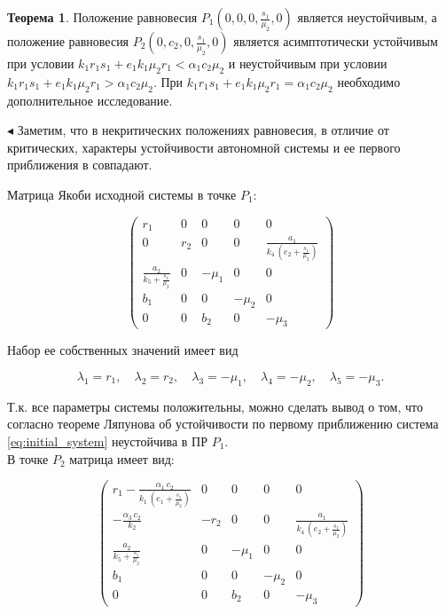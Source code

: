 \documentclass[12pt,a4paper]{extarticle}
\renewenvironment{proof}{\noindent$\blacktriangleleft$}{}
\theoremstyle{definition}
\newtheorem{theorem}{Теорема}
\theoremstyle{definition}
\theoremstyle{definition}
\begin{document}
	\begin{theorem}
		Положение равновесия $P_1\left(0,0,0,\frac{s_1}{\mu_2},0\right)$ является неустойчивым, а положение равновесия $P_2\left(0,c_2,0,\frac{s_1}{\mu_2},0\right)$ является асимптотически устойчивым при условии $k_1r_1s_1 + e_1k_1\mu_2r_1< \alpha_1c_2\mu_2$ и неустойчивым при условии $k_1r_1s_1 + e_1k_1\mu_2r_1>\alpha_1c_2\mu_2$. При $k_1r_1s_1 + e_1k_1\mu_2r_1 = \alpha_1c_2\mu_2$ необходимо дополнительное исследование.
	\end{theorem}
	\begin{proof}
		Заметим, что в некритических положениях равновесия, в отличие от критических, характеры устойчивости автономной системы и ее первого приближения в совпадают.
		
		Матрица Якоби исходной системы в точке $P_1$:
		
		\[\begin{pmatrix}
			r_{1} & 0 & 0 & 0 & 0\\ 
			0 & r_{2} & 0 & 0 & \frac{a_{1}}{k_{4}\,\left(e_{2}+\frac{s_{1}}{\mu _{2}}\right)}\\ 
			\frac{a_{2}}{k_{5}+\frac{s_{1}}{\mu _{2}}} & 0 & -\mu _{1} & 0 & 0\\ 
			b_{1} & 0 & 0 & -\mu _{2} & 0\\ 
			0 & 0 & b_{2} & 0 & -\mu _{3} 
		\end{pmatrix}\]
		
		Набор ее собственных значений имеет вид
		
		\[\lambda_1=r_1,\quad \lambda_2=r_2,\quad \lambda_3=-\mu_1,\quad \lambda_4=-\mu_2,\quad \lambda_5=-\mu_3.\]
		
		Т.к. все параметры системы положительны, можно сделать вывод о том, что согласно теореме Ляпунова об устойчивости по первому приближению система \ref{eq:initial_system} неустойчива в ПР $P_1$.\\
		В точке $P_2$ матрица имеет вид:
		
		\[\begin{pmatrix}
			r_{1}-\frac{\alpha _{1}\,c_{2}}{k_{1}\,\left(e_{1}+\frac{s_{1}}{\mu _{2}}\right)} & 0 & 0 & 0 & 0\\ 
			-\frac{\alpha _{3}\,c_{2}}{k_{2}} & -r_{2} & 0 & 0 & \frac{a_{1}}{k_{4}\,\left(e_{2}+\frac{s_{1}}{\mu _{2}}\right)}\\ 
			\frac{a_{2}}{k_{5}+\frac{s_{1}}{\mu _{2}}} & 0 & -\mu _{1} & 0 & 0\\ 
			b_{1} & 0 & 0 & -\mu _{2} & 0\\ 
			0 & 0 & b_{2} & 0 & -\mu _{3}
		\end{pmatrix}\]
		

\end{proof}
\end{document}

